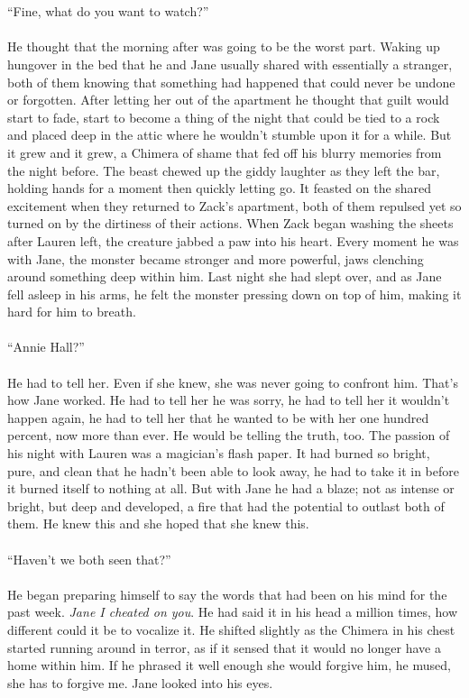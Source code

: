 \\\\	
“Fine, what do you want to watch?”
\\\\
He thought that the morning after was going to be the worst part. Waking up hungover in the bed that he and Jane usually shared with essentially a stranger, both of them knowing that something had happened that could never be undone or forgotten. After letting her out of the apartment he thought that guilt would start to fade, start to become a thing of the night that could be tied to a rock and placed deep in the attic where he wouldn’t stumble upon it for a while. But it grew and it grew, a Chimera of shame that fed off his blurry memories from the night before. The beast chewed up the giddy laughter as they left the bar, holding hands for a moment then quickly letting go. It feasted on the shared excitement when they returned to Zack’s apartment, both of them repulsed yet so turned on by the dirtiness of their actions. When Zack began washing the sheets after Lauren left, the creature jabbed a paw into his heart. Every moment he was with Jane, the monster became stronger and more powerful, jaws clenching around something deep within him. Last night she had slept over, and as Jane fell asleep in his arms, he felt the monster pressing down on top of him, making it hard for him to breath. 
\\\\	
“Annie Hall?”
\\\\
He had to tell her. Even if she knew, she was never going to confront him. That’s how Jane worked. He had to tell her he was sorry, he had to tell her it wouldn’t happen again, he had to tell her that he wanted to be with her one hundred percent, now more than ever. He would be telling the truth, too. The passion of his night with Lauren was a magician’s flash paper. It had burned so bright, pure, and clean that he hadn’t been able to look away, he had to take it in before it burned itself to nothing at all. But with Jane he had a blaze; not as intense or bright, but deep and developed, a fire that had the potential to outlast both of them. He knew this and she hoped that she knew this.
\\\\
“Haven’t we both seen that?”
\\\\
He began preparing himself to say the words that had been on his mind for the past week. \textit{Jane I cheated on you}. He had said it in his head a million times, how different could it be to vocalize it. He shifted slightly as the Chimera in his chest started running around in terror, as if it sensed that it would no longer have a home within him. If he phrased it well enough she would forgive him, he mused, she has to forgive me. Jane looked into his eyes.
